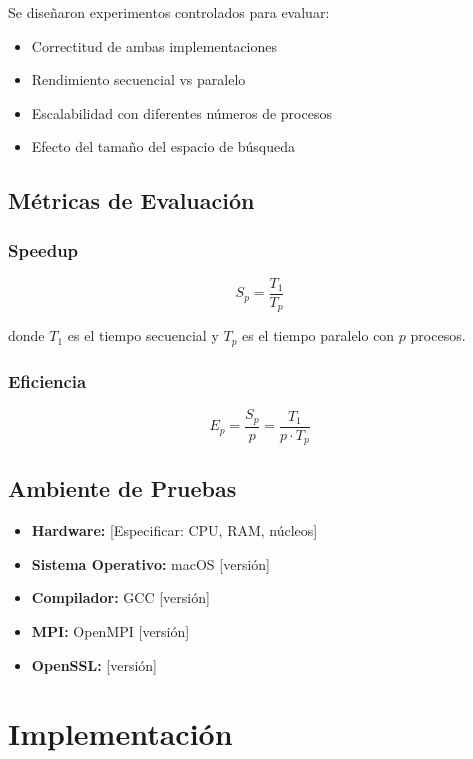 \documentclass[12pt,letterpaper]{article}
\begin{document}
Se diseñaron experimentos controlados para evaluar:
\begin{itemize}
    \item Correctitud de ambas implementaciones
    \item Rendimiento secuencial vs paralelo
    \item Escalabilidad con diferentes números de procesos
    \item Efecto del tamaño del espacio de búsqueda
\end{itemize}

\subsection{Métricas de Evaluación}

\subsubsection{Speedup}
\begin{equation}
S_p = \frac{T_1}{T_p}
\end{equation}

donde $T_1$ es el tiempo secuencial y $T_p$ es el tiempo paralelo con $p$ procesos.

\subsubsection{Eficiencia}
\begin{equation}
E_p = \frac{S_p}{p} = \frac{T_1}{p \cdot T_p}
\end{equation}

\subsection{Ambiente de Pruebas}

\begin{itemize}
    \item \textbf{Hardware:} [Especificar: CPU, RAM, núcleos]
    \item \textbf{Sistema Operativo:} macOS [versión]
    \item \textbf{Compilador:} GCC [versión]
    \item \textbf{MPI:} OpenMPI [versión]
    \item \textbf{OpenSSL:} [versión]
\end{itemize}

\section{Implementación}
\end{document}

